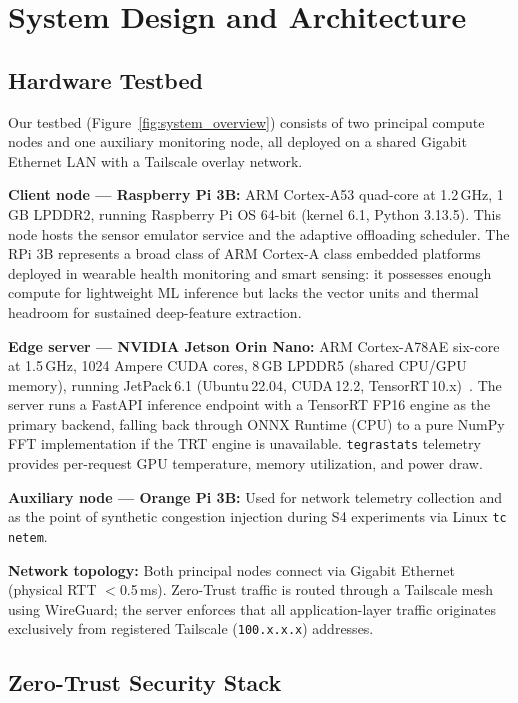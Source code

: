 \documentclass[10pt,twocolumn]{article}
\begin{document}
\section{System Design and Architecture}

\subsection{Hardware Testbed}

Our testbed (Figure~\ref{fig:system_overview}) consists of two principal
compute nodes and one auxiliary monitoring node, all deployed on a shared
Gigabit Ethernet LAN with a Tailscale overlay network.

\textbf{Client node — Raspberry Pi 3B:}
ARM Cortex-A53 quad-core at 1.2\,GHz, 1\,GB LPDDR2, running Raspberry Pi OS
64-bit (kernel 6.1, Python 3.13.5).  This node hosts the sensor emulator
service and the adaptive offloading scheduler.  The RPi 3B represents a
broad class of ARM Cortex-A class embedded platforms deployed in wearable
health monitoring and smart sensing: it possesses enough compute for
lightweight ML inference but lacks the vector units and thermal headroom
for sustained deep-feature extraction.

\textbf{Edge server — NVIDIA Jetson Orin Nano:}
ARM Cortex-A78AE six-core at 1.5\,GHz, 1024 Ampere CUDA cores, 8\,GB
LPDDR5 (shared CPU/GPU memory), running JetPack\,6.1 (Ubuntu\,22.04,
CUDA\,12.2, TensorRT\,10.x)~\cite{jetson_orin}.  The server runs a FastAPI
inference endpoint with a TensorRT FP16 engine as the primary backend,
falling back through ONNX Runtime (CPU) to a pure NumPy FFT implementation if
the TRT engine is unavailable.  \texttt{tegrastats} telemetry provides
per-request GPU temperature, memory utilization, and power draw.

\textbf{Auxiliary node — Orange Pi 3B:}
Used for network telemetry collection and as the point of synthetic congestion
injection during S4 experiments via Linux \texttt{tc netem}.

\textbf{Network topology:}
Both principal nodes connect via Gigabit Ethernet (physical RTT $<$0.5\,ms).
Zero-Trust traffic is routed through a Tailscale mesh using WireGuard;
the server enforces that all application-layer traffic originates exclusively
from registered Tailscale (\texttt{100.x.x.x}) addresses.

\subsection{Zero-Trust Security Stack}
\end{document}
